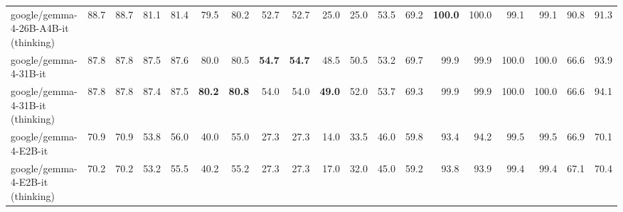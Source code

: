 \documentclass{article}
\begin{document}
\begin{table}[htbp]
\begin{threeparttable}
\begin{adjustbox}{max width=\textwidth}
\begin{tabular}{lrrrrrrrrrrrrrrrrrr}
google/gemma-4-26B-A4B-it (thinking) & \cellcolor[HTML]{9ECBE1}88.7 & \cellcolor[HTML]{9ECBE1}88.7 & \cellcolor[HTML]{B4D7E8}81.1 & \cellcolor[HTML]{B4D7E8}81.4 & \cellcolor[HTML]{94C6DE}79.5 & \cellcolor[HTML]{94C6DE}80.2 & \cellcolor[HTML]{9BC9E0}52.7 & \cellcolor[HTML]{9BC9E0}52.7 & \cellcolor[HTML]{FEFEFD}25.0 & \cellcolor[HTML]{F7C4AE}25.0 & \cellcolor[HTML]{B3D6E7}53.5 & \cellcolor[HTML]{9BCAE0}69.2 & \cellcolor[HTML]{92C5DE}\textbf{100.0} & \cellcolor[HTML]{92C5DE}100.0 & \cellcolor[HTML]{93C6DE}99.1 & \cellcolor[HTML]{93C6DE}99.1 & \cellcolor[HTML]{9ECBE1}90.8 & \cellcolor[HTML]{9ECBE1}91.3 \\
google/gemma-4-31B-it & \cellcolor[HTML]{A2CDE3}87.8 & \cellcolor[HTML]{A2CDE3}87.8 & \cellcolor[HTML]{A3CEE3}87.5 & \cellcolor[HTML]{A3CEE3}87.6 & \cellcolor[HTML]{92C5DE}80.0 & \cellcolor[HTML]{93C5DE}80.5 & \cellcolor[HTML]{92C5DE}\textbf{54.7} & \cellcolor[HTML]{92C5DE}\textbf{54.7} & \cellcolor[HTML]{94C6DE}48.5 & \cellcolor[HTML]{A2CDE2}50.5 & \cellcolor[HTML]{B4D7E8}53.2 & \cellcolor[HTML]{98C8E0}69.7 & \cellcolor[HTML]{92C5DE}99.9 & \cellcolor[HTML]{92C5DE}99.9 & \cellcolor[HTML]{92C5DE}100.0 & \cellcolor[HTML]{92C5DE}100.0 & \cellcolor[HTML]{DAEBF3}66.6 & \cellcolor[HTML]{98C8DF}93.9 \\
google/gemma-4-31B-it (thinking) & \cellcolor[HTML]{A2CDE3}87.8 & \cellcolor[HTML]{A2CDE3}87.8 & \cellcolor[HTML]{A4CEE3}87.4 & \cellcolor[HTML]{A4CEE3}87.5 & \cellcolor[HTML]{92C5DE}\textbf{80.2} & \cellcolor[HTML]{92C5DE}\textbf{80.8} & \cellcolor[HTML]{95C6DE}54.0 & \cellcolor[HTML]{95C6DE}54.0 & \cellcolor[HTML]{92C5DE}\textbf{49.0} & \cellcolor[HTML]{98C8DF}52.0 & \cellcolor[HTML]{B2D6E7}53.7 & \cellcolor[HTML]{9AC9E0}69.3 & \cellcolor[HTML]{92C5DE}99.9 & \cellcolor[HTML]{92C5DE}99.9 & \cellcolor[HTML]{92C5DE}100.0 & \cellcolor[HTML]{92C5DE}100.0 & \cellcolor[HTML]{DAEBF3}66.6 & \cellcolor[HTML]{98C8DF}94.1 \\
google/gemma-4-E2B-it & \cellcolor[HTML]{F9FCFD}70.9 & \cellcolor[HTML]{F9FCFD}70.9 & \cellcolor[HTML]{FAFCFD}53.8 & \cellcolor[HTML]{F7FBFC}56.0 & \cellcolor[HTML]{FADED1}40.0 & \cellcolor[HTML]{FDFEFE}55.0 & \cellcolor[HTML]{FDF2ED}27.3 & \cellcolor[HTML]{FDF1EB}27.3 & \cellcolor[HTML]{F9D4C3}14.0 & \cellcolor[HTML]{FDF1EC}33.5 & \cellcolor[HTML]{DAEBF3}46.0 & \cellcolor[HTML]{CBE3EF}59.8 & \cellcolor[HTML]{A2CDE3}93.4 & \cellcolor[HTML]{A0CCE2}94.2 & \cellcolor[HTML]{93C5DE}99.5 & \cellcolor[HTML]{93C5DE}99.5 & \cellcolor[HTML]{D9EAF3}66.9 & \cellcolor[HTML]{D3E7F1}70.1 \\
google/gemma-4-E2B-it (thinking) & \cellcolor[HTML]{FDFEFE}70.2 & \cellcolor[HTML]{FDFEFE}70.2 & \cellcolor[HTML]{FBFDFE}53.2 & \cellcolor[HTML]{F8FBFD}55.5 & \cellcolor[HTML]{FBDED2}40.2 & \cellcolor[HTML]{FCFDFE}55.2 & \cellcolor[HTML]{FDF2ED}27.3 & \cellcolor[HTML]{FDF1EB}27.3 & \cellcolor[HTML]{FBDFD3}17.0 & \cellcolor[HTML]{FCE9E1}32.0 & \cellcolor[HTML]{DFEEF5}45.0 & \cellcolor[HTML]{CEE5F0}59.2 & \cellcolor[HTML]{A1CDE2}93.8 & \cellcolor[HTML]{A1CDE2}93.9 & \cellcolor[HTML]{93C5DE}99.4 & \cellcolor[HTML]{93C5DE}99.4 & \cellcolor[HTML]{D9EAF3}67.1 & \cellcolor[HTML]{D2E7F1}70.4 \\

\end{tabular}
\end{adjustbox}
\end{threeparttable}
\end{table}
\end{document}
